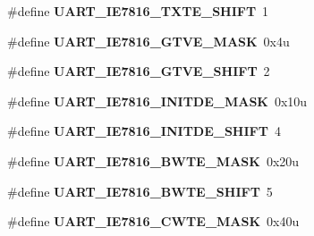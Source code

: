 \begin{DoxyCompactItemize}
\item 
\hypertarget{group___u_a_r_t___register___masks_gad0266a63ef5e0bb5dfaa2c87c2a1639e}{}\#define {\bfseries U\+A\+R\+T\+\_\+\+I\+E7816\+\_\+\+T\+X\+T\+E\+\_\+\+S\+H\+I\+F\+T}~1\label{group___u_a_r_t___register___masks_gad0266a63ef5e0bb5dfaa2c87c2a1639e}

\item 
\hypertarget{group___u_a_r_t___register___masks_ga64b8f696aa038e3a27d743e024632e7d}{}\#define {\bfseries U\+A\+R\+T\+\_\+\+I\+E7816\+\_\+\+G\+T\+V\+E\+\_\+\+M\+A\+S\+K}~0x4u\label{group___u_a_r_t___register___masks_ga64b8f696aa038e3a27d743e024632e7d}

\item 
\hypertarget{group___u_a_r_t___register___masks_ga92681ae737e84944e46e525a831303b9}{}\#define {\bfseries U\+A\+R\+T\+\_\+\+I\+E7816\+\_\+\+G\+T\+V\+E\+\_\+\+S\+H\+I\+F\+T}~2\label{group___u_a_r_t___register___masks_ga92681ae737e84944e46e525a831303b9}

\item 
\hypertarget{group___u_a_r_t___register___masks_ga6e0fc67109bbfda4ecffbb29a7bdcac7}{}\#define {\bfseries U\+A\+R\+T\+\_\+\+I\+E7816\+\_\+\+I\+N\+I\+T\+D\+E\+\_\+\+M\+A\+S\+K}~0x10u\label{group___u_a_r_t___register___masks_ga6e0fc67109bbfda4ecffbb29a7bdcac7}

\item 
\hypertarget{group___u_a_r_t___register___masks_ga92e0d4cc206532c7e058e7b0eae64492}{}\#define {\bfseries U\+A\+R\+T\+\_\+\+I\+E7816\+\_\+\+I\+N\+I\+T\+D\+E\+\_\+\+S\+H\+I\+F\+T}~4\label{group___u_a_r_t___register___masks_ga92e0d4cc206532c7e058e7b0eae64492}

\item 
\hypertarget{group___u_a_r_t___register___masks_ga1c4d8cb11c43f38d1d2254ae85517aa0}{}\#define {\bfseries U\+A\+R\+T\+\_\+\+I\+E7816\+\_\+\+B\+W\+T\+E\+\_\+\+M\+A\+S\+K}~0x20u\label{group___u_a_r_t___register___masks_ga1c4d8cb11c43f38d1d2254ae85517aa0}

\item 
\hypertarget{group___u_a_r_t___register___masks_ga9836d1c354b24274e92d300009b0b416}{}\#define {\bfseries U\+A\+R\+T\+\_\+\+I\+E7816\+\_\+\+B\+W\+T\+E\+\_\+\+S\+H\+I\+F\+T}~5\label{group___u_a_r_t___register___masks_ga9836d1c354b24274e92d300009b0b416}

\item 
\hypertarget{group___u_a_r_t___register___masks_ga9722a9d0abe861759ebfce9a874790d7}{}\#define {\bfseries U\+A\+R\+T\+\_\+\+I\+E7816\+\_\+\+C\+W\+T\+E\+\_\+\+M\+A\+S\+K}~0x40u\label{group___u_a_r_t___register___masks_ga9722a9d0abe861759ebfce9a874790d7}


\end{DoxyCompactItemize}
